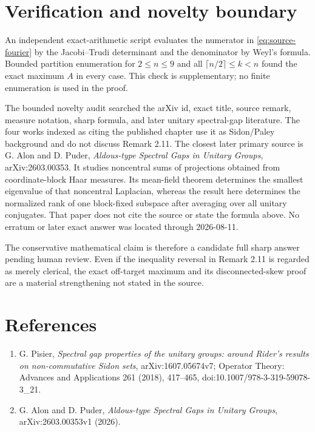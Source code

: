 \documentclass[11pt]{article}
\begin{document}
\section{Verification and novelty boundary}

An independent exact-arithmetic script evaluates the numerator in
\eqref{eq:source-fourier} by the Jacobi--Trudi determinant and the denominator
by Weyl's formula.  Bounded partition enumeration for $2\leq n\leq9$ and all
$\lceil n/2\rceil\leq k<n$ found the exact maximum $A$ in every case.  This
check is supplementary; no finite enumeration is used in the proof.

The bounded novelty audit searched the arXiv id, exact title, source remark,
measure notation, sharp formula, and later unitary spectral-gap literature.
The four works indexed as citing the published chapter use it as Sidon/Paley
background and do not discuss Remark 2.11.  The closest later primary source
is G. Alon and D. Puder, \emph{Aldous-type Spectral Gaps in Unitary Groups},
arXiv:2603.00353.  It studies noncentral sums of projections obtained from
coordinate-block Haar measures.  Its mean-field theorem determines the
smallest eigenvalue of that noncentral Laplacian, whereas the result here
determines the normalized rank of one block-fixed subspace after averaging
over all unitary conjugates.  That paper does not cite the source or state the
formula above.  No erratum or later exact answer was located through
2026-08-11.

The conservative mathematical claim is therefore a candidate full sharp
answer pending human review.  Even if the inequality reversal in Remark 2.11
is regarded as merely clerical, the exact off-target maximum and its
disconnected-skew proof are a material strengthening not stated in the
source.

\section*{References}

{\small
\begin{enumerate}
\item G. Pisier, \emph{Spectral gap properties of the unitary groups:
around Rider's results on non-commutative Sidon sets}, arXiv:1607.05674v7;
Operator Theory: Advances and Applications 261 (2018), 417--465,
doi:10.1007/978-3-319-59078-3\_21.
\item G. Alon and D. Puder, \emph{Aldous-type Spectral Gaps in Unitary
Groups}, arXiv:2603.00353v1 (2026).
\end{enumerate}
}
\end{document}

